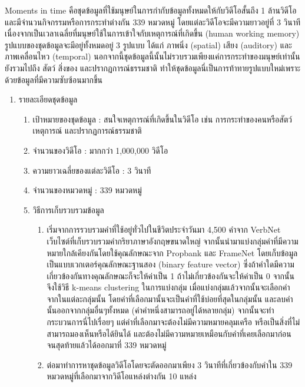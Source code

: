 Moments in time\textsuperscript{\cite{monfort2019moments}} คือชุดข้อมูลที่ใช้มนุษย์ในการกำกับข้อมูลทั้งหมดให้กับวิดีโอสั้นถึง 1 ล้านวิดีโอ 
และมีจำนวนกิจกรรมหรือการกระทำต่างกัน 339 หมวดหมู่ โดยแต่ละวิดีโอจะมีความยาวอยู่ที่ 3 วินาที เนื่องจากเป็นเวลาเฉลี่ยที่มนุษย์ใช้ในการเข้าใจกับเหตุการณ์ที่เกิดขึ้น
(human working memory) รูปแบบของชุดข้อมูลจะมีอยู่ทั้งหมดอยู่ 3 รูปแบบ ได้แก่ ภาพนิ่ง (spatial) เสียง (auditory) และภาพเคลื่อนไหว (temporal) 
นอกจากนี้ชุดข้อมูลนี้นั้นไม่รวบรวมเพียงแค่การกระทำของมนุษย์เท่านั้น ยังรวมไปถึง สัตว์ สิ่งของ และปรากฏการณ์ธรรมชาติ ทำให้ชุดข้อมูลนี่เป็นการท้าทายรูปแบบใหม่เพราะด้วยข้อมูลที่มีความซับซ้อนมากขึ้น
\begin{enumerate}
	\item {รายละเอียดชุดข้อมูล}
	\begin{enumerate}
		\setlength\itemsep{-0.25em}
		\item เป้าหมายของชุดข้อมูล : สนใจเหตุการณ์ที่เกิดขึ้นในวิดีโอ เช่น การกระทำของคนหรือสัตว์ เหตุการณ์ และปรากฏการณ์ธรรมชาติ 
		\item จำนวนของวิดีโอ : มากกว่า 1,000,000 วิดีโอ
		\item ความยาวเฉลี่ยของแต่ละวิดีโอ : 3 วินาที
		\item จำนวนของหมวดหมู่ : 339 หมวดหมู่
		\item วิธีการเก็บรวบรวมข้อมูล
	\begin{enumerate}
		\item เริ่มจากการรวบรวมคำที่ใช้อยู่ทั่วไปในชีวิตประจำวันมา 4,500 คำจาก VerbNet\textsuperscript{\cite{Schuler:2005:VBC:1104493}} เว็บไซต์ที่เก็บรวบรวมคำกริยาภาษาอังกฤษขนาดใหญ่ 
		จากนั้นนำมาแบ่งกลุ่มคำที่มีความหมายใกล้เคียงกันโดยใช้คุณลักษณะจาก Propbank\textsuperscript{\cite{Zaghouani:2010:RAP:1868720.1868756}} และ
		FrameNet\textsuperscript{\cite{Baker:1998:BFP:980451.980860}} โดยเก็บข้อมูลเป็นแบบเวกเตอร์คุณลักษณะฐานสอง (binary feature vector) 
		ซึ่งถ้าคำใดมีความเกี่ยวข้องกันทางคุณลักษณะก็จะให้ค่าเป็น 1 ถ้าไม่เกี่ยวข้องกันจะให้ค่าเป็น 0 จากนั้นจึงใช้วิธี k-means clustering ในการแบ่งกลุ่ม 
		เมื่อแบ่งกลุ่มแล้วจากนั้นจะเลือกคำจากในแต่ละกลุ่มนั้น โดยคำที่เลือกมานั้นจะเป็นคำที่ใช้บ่อยที่สุดในกลุ่มนั้น และลบคำนั้นออกจากกลุ่มอื่นๆทั้งหมด (คำคำหนึ่งสามารถอยู่ได้หลายกลุ่ม) 
		จากนั้นจะทำกระบวนการนี่ไปเรื่อยๆ แต่คำที่เลือกมาจะต้องไม่มีความหมายคลุมเครือ หรือเป็นสิ่งที่ไม่สามารถมองเห็นหรือได้ยินได้ และต้องไม่มีความหมายเหมือนกับคำที่เคยเลือกมาก่อน 
		จนสุดท้ายแล้วได้ออกมาที่ 339 หมวดหมู่
		\item ต่อมาทำการหาชุดข้อมูลวิดีโอโดยจะตัดออกมาเพียง 3 วินาทีที่เกี่ยวข้องกับคำใน 339 หมวดหมู่ที่เลือกมาจากวิดีโอแหล่งต่างกัน 10 แหล่ง 

\end{enumerate}
\end{enumerate}
\end{enumerate}
